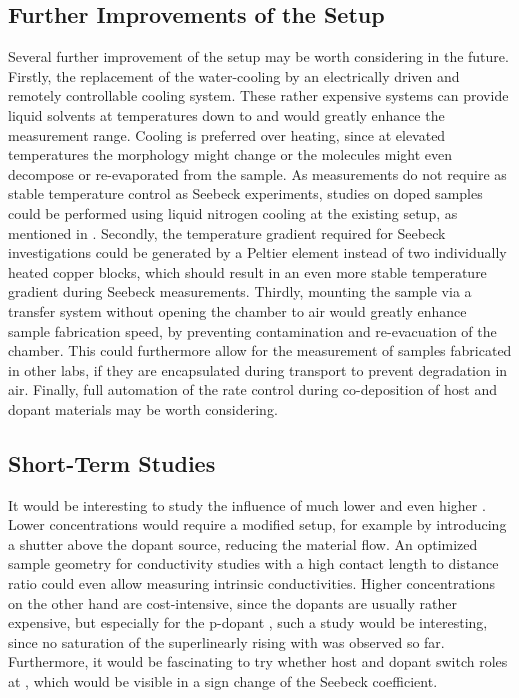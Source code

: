 \subsection*{Further Improvements of the Setup}
Several further improvement of the setup may be worth considering in the future.
Firstly, the replacement of the water-cooling by an electrically driven and remotely controllable cooling system. These rather expensive systems can provide liquid solvents at temperatures down to  and would greatly enhance the measurement range. Cooling is preferred over heating, since at elevated temperatures the morphology might change or the molecules might even decompose or re-evaporated from the sample. As \cLong measurements do not require as stable temperature control as Seebeck experiments, \cLong studies on doped samples could be performed using liquid nitrogen cooling at the existing setup, as mentioned in .
Secondly, the temperature gradient required for Seebeck investigations could be generated by a Peltier element instead of two individually heated copper blocks\cite{Pernstich2008}, which should result in an even more stable temperature gradient during Seebeck measurements.
Thirdly, \insitu mounting the sample via a transfer system without opening the chamber to air would greatly enhance sample fabrication speed, by preventing contamination and re-evacuation of the chamber.
This could furthermore allow for the measurement of samples fabricated in other labs, if they are encapsulated during transport to prevent degradation in air.
Finally, full automation of the rate control during co-deposition of host and dopant materials may be worth considering.

\subsection*{Short-Term Studies}
It would be interesting to study the influence of much lower and even higher \CLongs.
Lower concentrations would require a modified setup, for example by introducing a shutter above the dopant source, reducing the material flow.
An optimized sample geometry for conductivity studies with a high contact length to distance ratio could even allow measuring intrinsic conductivities.
Higher concentrations on the other hand are cost-intensive, since the dopants are usually rather expensive, but especially for the p-dopant \FS, such a study would be interesting, since no saturation of the superlinearly rising \cLong with \CLong was observed so far.
Furthermore, it would be fascinating to try whether host and dopant switch roles at , which would be visible in a sign change of the Seebeck coefficient.

